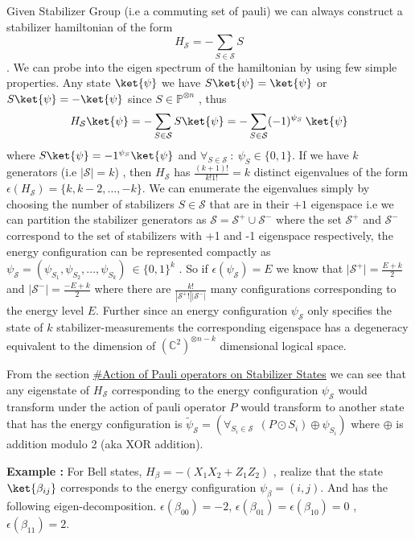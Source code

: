 \documentclass[
]{article}
\begin{document}
Given Stabilizer Group (i.e a commuting set of pauli) we can always
construct a stabilizer hamiltonian of the form
\[H_{\mathcal{S}}= - \sum\limits_{S \in \mathcal{S}} S\]. We can probe
into the eigen spectrum of the hamiltonian by using few simple
properties. Any state \(\ket{\psi}\) we have
\(S \ket{\psi} =\ket{\psi}\) or \(S \ket{\psi}=-\ket{\psi}\) since
\(S \in \mathbb{P}^{\otimes{n}}\) , thus
\[H_{\mathcal{S}}\ket{\psi}=- \sum\limits_{S \in \mathcal{S}}S \ket{\psi} = - \sum\limits_{S\in \mathcal{S}} (-1)^{\psi_{S}}\: \ket{\psi}\]
where \(S \ket{\psi} = -1^{\psi_{S}}\ket{\psi}\) and
\(\forall_{S \in \mathcal{S}} \:: \:\psi_{S}\in \{0,1\}\). If we have
\(k\) generators (i.e \(|\mathcal{S}|=k\)) , then \(H_{\mathcal{S}}\)
has \(\frac{(k+1)!}{k! 1!}=k\) distinct eigenvalues of the form
\(\epsilon(H_{\mathcal{S}}) =\{k, k-2, \dots ,-k\}\). We can enumerate
the eigenvalues simply by choosing the number of stabilizers
\(S \in \mathcal{S}\) that are in their \(+1\) eigenspace i.e we can
partition the stabilizer generators as
\(\mathcal{S} = \mathcal{S^{+}} \cup \mathcal{S^{-}}\) where the set
\(\mathcal{S^+}\) and \(\mathcal{S^{-}}\) correspond to the set of
stabilizers with +1 and -1 eigenspace respectively, the energy
configuration can be represented compactly as
\(\psi_\mathcal{S} = (\psi_{S_{1}}, \psi_{S_{2}}, \dots , \psi_{S_{k}})\:\in \{0,1\}^k\)
. So if \(\epsilon(\psi_{\mathcal{S}}) = E\) we know that
\(|\mathcal{S^{+}|}= \frac{E+k}{2}\) and
\(|\mathcal{S^-}|=\frac{-E+k}{2}\) where there are
\(\frac{k!}{|\mathcal{S}^{+}!||\mathcal{S}^{-}|}\) many configurations
corresponding to the energy level \(E\). Further since an energy
configuration \(\psi_{\mathcal{S}}\) only specifies the state of \(k\)
stabilizer-measurements the corresponding eigenspace has a degeneracy
equivalent to the dimension of \((\mathbb{C}^2)^{\otimes n-k}\)
dimensional logical space.

From the section
\protect\hyperlink{Actionux5cux2520ofux5cux2520Pauliux5cux2520operatorsux5cux2520onux5cux2520Stabilizerux5cux2520States.md}{\#Action
of Pauli operators on Stabilizer States} we can see that any eigenstate
of \(H_{\mathcal{S}}\) corresponding to the energy configuration
\(\psi_\mathcal{S}\) would transform under the action of pauli operator
\(P\) would transform to another state that has the energy configuration
is
\(\tilde{\psi}_\mathcal{S}= (\forall_{S_{i}\in \mathcal{S}} \: \: (P \odot S_{i})\oplus\psi_{S_{i}})\)
where \(\oplus\) is addition modulo 2 (aka XOR addition).

\textbf{Example :} For Bell states,
\(H_{\beta} = - (X_{1}X_{2} + Z_{1}Z_{2})\) , realize that the state
\(\ket{\beta_{ij}}\) corresponds to the energy configuration
\(\psi_{\beta}= (i,j)\). And has the following eigen-decomposition.
\(\epsilon(\beta_{00})=-2\),
\(\epsilon(\beta_{01}) = \epsilon(\beta_{10}) =0\)
,\(\epsilon(\beta_{11}) = 2\).
\end{document}
